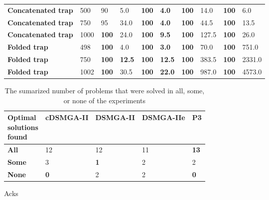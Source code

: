 \begin{table*}
\begin{tabular}{llllllllll}
		\textbf{Concatenated trap} & 500 & 90 & 5.0 & \textbf{100} & \textbf{4.0} & \textbf{100} & 14.0 & \textbf{100} & 6.0 \\
		\textbf{Concatenated trap} & 750 & 95 & 34.0 & \textbf{100} & \textbf{4.0} & \textbf{100} & 44.5 & \textbf{100} & 13.5 \\
		\textbf{Concatenated trap} & 1000 & \textbf{100} & 24.0 & \textbf{100} & \textbf{9.5} & \textbf{100} & 127.5 & \textbf{100} & 26.0 \\
		\textbf{Folded trap} & 498 & \textbf{100} & 4.0 & \textbf{100} & \textbf{3.0} & \textbf{100} & 70.0 & \textbf{100} & 751.0 \\
		\textbf{Folded trap} & 750 & \textbf{100} & \textbf{12.5} & \textbf{100} & \textbf{12.5} & \textbf{100} & 383.5 & \textbf{100} & 2331.0 \\
		\textbf{Folded trap} & 1002 & \textbf{100} & 30.5 & \textbf{100} & \textbf{22.0} & \textbf{100} & 987.0 & \textbf{100} & 4573.0 \\
		\bottomrule
	\end{tabular}
\end{table*} 

\begin{table}
	\caption{The sumarized number of problems that were solved in all, some, or none of the experiments}
	\label{tab:numberOfSolvedProblems}
	\begin{tabular}{lllll}
		\toprule
		\pbox{20cm}{\textbf{Optimal} \\ \textbf{solutions} \\ \textbf{found}} & \textbf{cDSMGA-II} & \textbf{DSMGA-II} & \textbf{DSMGA-IIe} & \textbf{P3} \\
		\midrule
		\textbf{All} & 12 & 12 & 11 & \textbf{13} \\
		\textbf{Some} & 3 & \textbf{1} & 2 & 2 \\
		\textbf{None} & \textbf{0} & 2 & 2 & \textbf{0} \\
		\bottomrule
	\end{tabular}
\end{table}

\begin{acks}
	Acks
\end{acks}